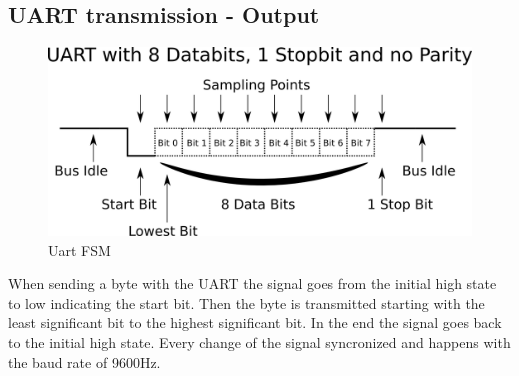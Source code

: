 \documentclass[12pt,a4 paper] {report}
\begin{document}
\subsection*{UART transmission - Output}
\begin{figure}[h]
	\centering	
	\includegraphics[scale=0.5]{../png/rs232image.png}
	\caption{Uart FSM}
\end{figure}
When sending a byte with the UART the signal goes from the initial high state to low indicating the start bit. Then the byte is transmitted starting 
with the least significant bit to the highest significant bit. In the end the signal goes back to the initial high state. Every change of the signal 
syncronized and happens with the baud rate of 9600Hz.

\newpage
\end{document}
